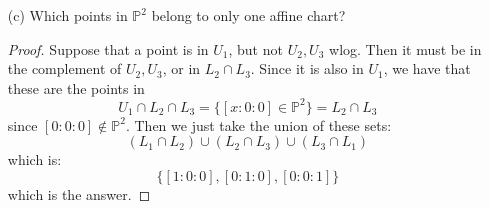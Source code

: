 \documentclass{article}
\begin{document}
\begin{itemize}
\begin{answer}
            \end{answer}

        \item [(c)] Which points in $\mathbb{P}^{2}$ belong to only one affine chart? 
            \begin{proof}
                Suppose that a point is in $U_{1}$, but not $U_{2}, U_{3}$ wlog. Then it must be in the complement of $U_{2}, U_{3}$, or in $L_{2} \cap L_{3}$. Since it is also in $U_{1}$, we have that these are the points in 
                    \begin{equation*}
                        U_{1} \cap L_{2} \cap L_{3} = \{[x : 0 : 0] \in \mathbb{P}^{2}\} = L_{2} \cap L_{3}
                    \end{equation*}
                since $[0 : 0 : 0] \notin \mathbb{P}^{2}$. Then we just take the union of these sets:
                    \begin{equation*}
                        (L_{1} \cap L_{2}) \cup (L_{2} \cap L_{3}) \cup (L_{3} \cap L_{1})
                    \end{equation*}
                which is:
                   \begin{equation*}
                        \{[1 : 0 : 0], [0 : 1 : 0], [0 : 0 : 1]\}
                    \end{equation*}
                which is the answer.
            \end{proof}
    \end{itemize}
\end{document}

